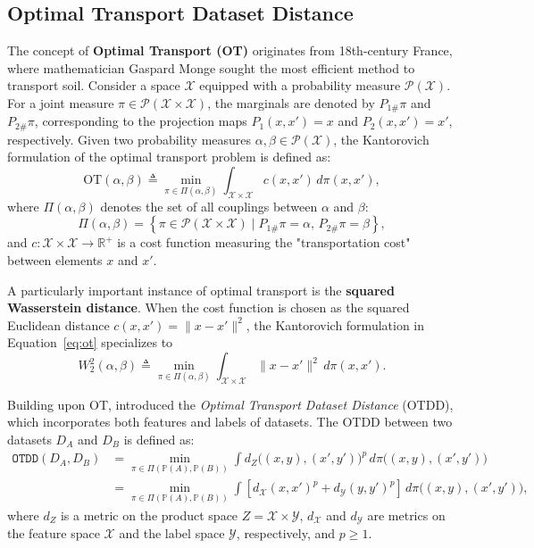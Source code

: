 \subsection{Optimal Transport Dataset Distance}
\label{appendix:otdd_background}
The concept of \textbf{Optimal Transport (OT)} originates from 18th-century France, where mathematician Gaspard Monge sought the most efficient method to transport soil. Consider a space $\mathcal{X}$ equipped with a probability measure $\mathcal{P}(\mathcal{X})$. For a joint measure $\pi \in \mathcal{P}(\mathcal{X} \times \mathcal{X})$, the marginals are denoted by $P_{1\#}\pi$ and $P_{2\#}\pi$, corresponding to the projection maps $P_1(x, x') = x$ and $P_2(x, x') = x'$, respectively.
Given two probability measures $\alpha, \beta \in \mathcal{P}(\mathcal{X})$, the Kantorovich formulation of the optimal transport problem is defined as:
\begin{equation}\label{eq:ot}
    \text{OT}(\alpha, \beta) \triangleq \min_{\pi \in \Pi(\alpha, \beta)} \int_{\mathcal{X} \times \mathcal{X}} c(x, x') \, d\pi(x, x'),
\end{equation}
where $\Pi(\alpha, \beta)$ denotes the set of all couplings between $\alpha$ and $\beta$:
\[
\Pi(\alpha, \beta) = \left\{ \pi \in \mathcal{P}(\mathcal{X} \times \mathcal{X}) \mid P_{1\#}\pi = \alpha, \, P_{2\#}\pi = \beta \right\},
\]
and $c: \mathcal{X} \times \mathcal{X} \rightarrow \mathbb{R}^+$ is a cost function measuring the "transportation cost" between elements $x$ and $x'$.

\noindent A particularly important instance of optimal transport is the \textbf{squared Wasserstein distance}. When the cost function is chosen as the squared Euclidean distance $c(x, x') = \|x - x'\|^2$,
the Kantorovich formulation in Equation~\eqref{eq:ot} specializes to
\[
W_2^2(\alpha, \beta) \triangleq \min_{\pi \in \Pi(\alpha, \beta)} \int_{\mathcal{X} \times \mathcal{X}} \|x - x'\|^2 \, d\pi(x, x').
\]

\noindent Building upon OT, \citet{alvarez2020otdd} introduced the \emph{Optimal Transport Dataset Distance} (OTDD), which incorporates both features and labels of datasets. The OTDD between two datasets $D_A$ and $D_B$ is defined as:
\begin{align*}
\texttt{OTDD}(D_A, D_B) &= \min_{\pi \in \Pi(\mathbb{P}(A), \mathbb{P}(B))} \int d_Z\big( (x, y), (x', y') \big)^p \, d\pi\big( (x, y), (x', y') \big) \\
&= \min_{\pi \in \Pi(\mathbb{P}(A), \mathbb{P}(B))} \int \left[ d_{\mathcal{X}}(x, x')^p + d_{\mathcal{Y}}(y, y')^p \right] \, d\pi\big( (x, y), (x', y') \big),
\end{align*}
where $d_Z$ is a metric on the product space $Z = \mathcal{X} \times \mathcal{Y}$, $d_{\mathcal{X}}$ and $d_{\mathcal{Y}}$ are metrics on the feature space $\mathcal{X}$ and the label space $\mathcal{Y}$, respectively, and $p \geq 1$.

